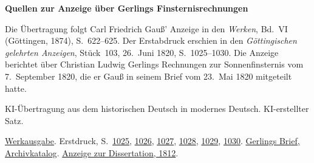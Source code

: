 \clearpage\thispagestyle{empty}
\begin{center}\Large\bfseries Quellen zur Anzeige über Gerlings Finsternisrechnungen\end{center}

Die Übertragung folgt Carl Friedrich Gauß’ Anzeige in den \emph{Werken}, Bd.~VI (Göttingen, 1874), S.~622--625. Der Erstabdruck erschien in den \emph{Göttingischen gelehrten Anzeigen}, Stück~103, 26.~Juni 1820, S.~1025--1030. Die Anzeige berichtet über Christian Ludwig Gerlings Rechnungen zur Sonnenfinsternis vom 7.~September 1820, die er Gauß in seinem Brief vom 23.~Mai 1820 mitgeteilt hatte.

KI-Übertragung aus dem historischen Deutsch in modernes Deutsch. KI-erstellter Satz.

\href{https://gdz.sub.uni-goettingen.de/id/PPN236007467}{Werkausgabe}. Erstdruck, S.~\href{https://images.p.sub.uni-goettingen.de/iiif/image/gdz:PPN319721507_1820:00001021/full/1850,/0/default.jpg}{1025}, \href{https://images.p.sub.uni-goettingen.de/iiif/image/gdz:PPN319721507_1820:00001022/full/1850,/0/default.jpg}{1026}, \href{https://images.p.sub.uni-goettingen.de/iiif/image/gdz:PPN319721507_1820:00001023/full/1850,/0/default.jpg}{1027}, \href{https://images.p.sub.uni-goettingen.de/iiif/image/gdz:PPN319721507_1820:00001024/full/1850,/0/default.jpg}{1028}, \href{https://images.p.sub.uni-goettingen.de/iiif/image/gdz:PPN319721507_1820:00001025/full/1850,/0/default.jpg}{1029}, \href{https://images.p.sub.uni-goettingen.de/iiif/image/gdz:PPN319721507_1820:00001026/full/1850,/0/default.jpg}{1030}. \href{https://kalliope-verbund.info/de/ead?ead.id=DE-611-HS-3219295}{Gerlings Brief, Archivkatalog}. \href{https://images.p.sub.uni-goettingen.de/iiif/image/gdz:PPN319721507_1812:00001933/full/1650,/0/default.jpg}{Anzeige zur Dissertation, 1812}.

\clearpage
